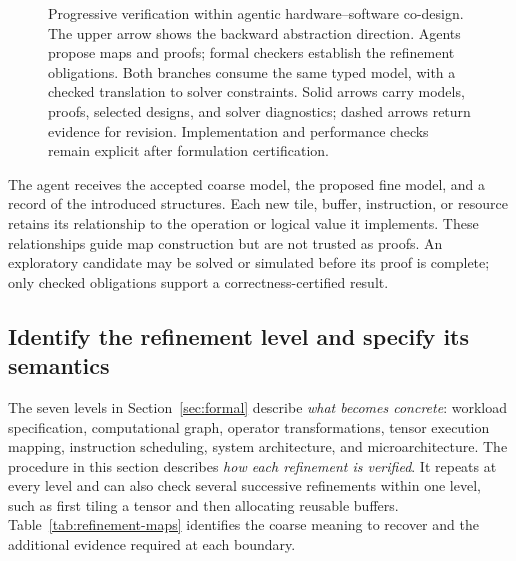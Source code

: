 \documentclass[11pt]{article}
\begin{document}
\begin{figure}[htbp]
\caption{Progressive verification within agentic hardware--software co-design. The upper arrow shows the backward abstraction direction. Agents propose maps and proofs; formal checkers establish the refinement obligations. Both branches consume the same typed model, with a checked translation to solver constraints. Solid arrows carry models, proofs, selected designs, and solver diagnostics; dashed arrows return evidence for revision. Implementation and performance checks remain explicit after formulation certification.}\label{fig:system}
\end{figure}

The agent receives the accepted coarse model, the proposed fine model, and a record of the introduced structures. Each new tile, buffer, instruction, or resource retains its relationship to the operation or logical value it implements. These relationships guide map construction but are not trusted as proofs. An exploratory candidate may be solved or simulated before its proof is complete; only checked obligations support a correctness-certified result.

\subsection{Identify the refinement level and specify its semantics}\label{sec:encoding}
The seven levels in Section~\ref{sec:formal} describe \emph{what becomes concrete}: workload specification, computational graph, operator transformations, tensor execution mapping, instruction scheduling, system architecture, and microarchitecture. The procedure in this section describes \emph{how each refinement is verified}. It repeats at every level and can also check several successive refinements within one level, such as first tiling a tensor and then allocating reusable buffers. Table~\ref{tab:refinement-maps} identifies the coarse meaning to recover and the additional evidence required at each boundary.
\end{document}
